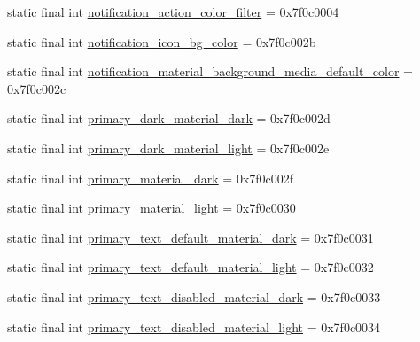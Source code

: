 \begin{CompactItemize}
\item 
static final int \hyperlink{classandroid_1_1support_1_1graphics_1_1drawable_1_1animated_1_1_r_1_1color_c0e7347fd6950f9c29da7c180cd3e10f}{notification\_\-action\_\-color\_\-filter} = 0x7f0c0004
\item 
static final int \hyperlink{classandroid_1_1support_1_1graphics_1_1drawable_1_1animated_1_1_r_1_1color_14ae51f064c655b09fde64092c17f986}{notification\_\-icon\_\-bg\_\-color} = 0x7f0c002b
\item 
static final int \hyperlink{classandroid_1_1support_1_1graphics_1_1drawable_1_1animated_1_1_r_1_1color_854526f60d6b660ee27ca3105ca75945}{notification\_\-material\_\-background\_\-media\_\-default\_\-color} = 0x7f0c002c
\item 
static final int \hyperlink{classandroid_1_1support_1_1graphics_1_1drawable_1_1animated_1_1_r_1_1color_23781c2c3aea4f118c4b768c0a733a54}{primary\_\-dark\_\-material\_\-dark} = 0x7f0c002d
\item 
static final int \hyperlink{classandroid_1_1support_1_1graphics_1_1drawable_1_1animated_1_1_r_1_1color_a512c09e61e4c14cc5b22e0aabba9b9b}{primary\_\-dark\_\-material\_\-light} = 0x7f0c002e
\item 
static final int \hyperlink{classandroid_1_1support_1_1graphics_1_1drawable_1_1animated_1_1_r_1_1color_466f3316988cb57fc02c9bfd29a9e2df}{primary\_\-material\_\-dark} = 0x7f0c002f
\item 
static final int \hyperlink{classandroid_1_1support_1_1graphics_1_1drawable_1_1animated_1_1_r_1_1color_dba5da38c68510b0259e36f23bbd3b2b}{primary\_\-material\_\-light} = 0x7f0c0030
\item 
static final int \hyperlink{classandroid_1_1support_1_1graphics_1_1drawable_1_1animated_1_1_r_1_1color_97e33372a233c327f2f4dc2ff1397417}{primary\_\-text\_\-default\_\-material\_\-dark} = 0x7f0c0031
\item 
static final int \hyperlink{classandroid_1_1support_1_1graphics_1_1drawable_1_1animated_1_1_r_1_1color_1eacb595ebe7d6e47b13f463b296d284}{primary\_\-text\_\-default\_\-material\_\-light} = 0x7f0c0032
\item 
static final int \hyperlink{classandroid_1_1support_1_1graphics_1_1drawable_1_1animated_1_1_r_1_1color_7412814abd55a14732fc4cb9477f87af}{primary\_\-text\_\-disabled\_\-material\_\-dark} = 0x7f0c0033
\item 
static final int \hyperlink{classandroid_1_1support_1_1graphics_1_1drawable_1_1animated_1_1_r_1_1color_4a3fc921435d914bfba8ad5aa752a237}{primary\_\-text\_\-disabled\_\-material\_\-light} = 0x7f0c0034

\end{CompactItemize}
